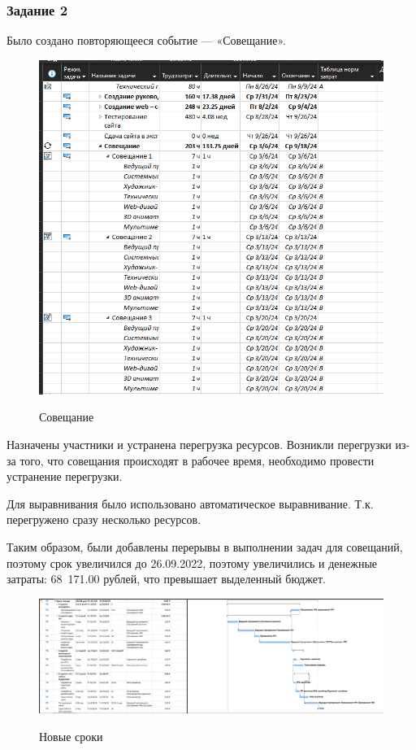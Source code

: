 \subsubsection{Задание 2}

Было создано повторяющееся событие --- «Совещание». 

\begin{figure}[ht!]
	\includegraphics[width=0.75\linewidth]{assets/images/sovesh.png}
	\label{fig:r2}
	\caption{Совещание}
\end{figure}
\FloatBarrier

Назначены участники и устранена перегрузка ресурсов.
Возникли перегрузки из-за того, что совещания происходят в рабочее время, необходимо провести устранение перегрузки.

Для выравнивания было использовано автоматическое выравнивание. Т.к. перегружено сразу несколько ресурсов.

Таким образом, были добавлены перерывы в выполнении задач для совещаний, поэтому срок увеличился до 26.09.2022, поэтому увеличились и денежные затраты: 68 171.00 рублей, что превышает выделенный бюджет.

\begin{figure}[ht!]
	\includegraphics[width=0.75\linewidth]{assets/images/gant-new.png}
	\label{fig:r2}
	\caption{Новые сроки}
\end{figure}
\FloatBarrier

